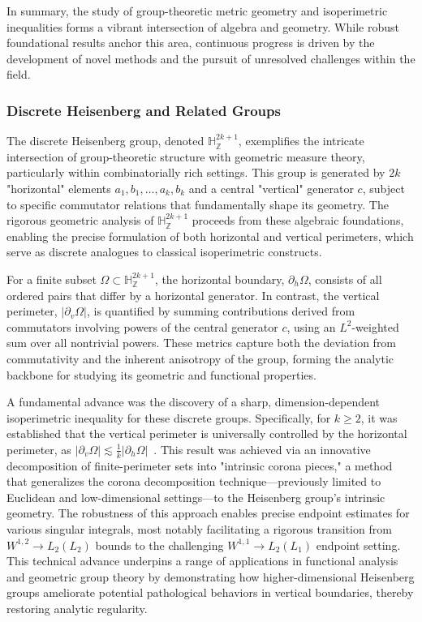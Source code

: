 \documentclass[sigconf]{acmart}
\begin{document}
In summary, the study of group-theoretic metric geometry and isoperimetric inequalities forms a vibrant intersection of algebra and geometry. While robust foundational results anchor this area, continuous progress is driven by the development of novel methods and the pursuit of unresolved challenges within the field.

\subsubsection{Discrete Heisenberg and Related Groups}

The discrete Heisenberg group, denoted $\mathbb{H}_{\mathbb{Z}}^{2k+1}$, exemplifies the intricate intersection of group-theoretic structure with geometric measure theory, particularly within combinatorially rich settings. This group is generated by $2k$ "horizontal" elements $a_1, b_1, \ldots, a_k, b_k$ and a central "vertical" generator $c$, subject to specific commutator relations that fundamentally shape its geometry. The rigorous geometric analysis of $\mathbb{H}_{\mathbb{Z}}^{2k+1}$ proceeds from these algebraic foundations, enabling the precise formulation of both horizontal and vertical perimeters, which serve as discrete analogues to classical isoperimetric constructs.

For a finite subset $\Omega \subset \mathbb{H}_{\mathbb{Z}}^{2k+1}$, the horizontal boundary, $\partial_{h}\Omega$, consists of all ordered pairs that differ by a horizontal generator. In contrast, the vertical perimeter, $|\partial_{v} \Omega|$, is quantified by summing contributions derived from commutators involving powers of the central generator $c$, using an $L^2$-weighted sum over all nontrivial powers. These metrics capture both the deviation from commutativity and the inherent anisotropy of the group, forming the analytic backbone for studying its geometric and functional properties.

A fundamental advance was the discovery of a sharp, dimension-dependent isoperimetric inequality for these discrete groups. Specifically, for $k \geq 2$, it was established that the vertical perimeter is universally controlled by the horizontal perimeter, as $|\partial_{v}\Omega| \lesssim \frac{1}{k} |\partial_{h}\Omega|$~\cite{ref108}. This result was achieved via an innovative decomposition of finite-perimeter sets into "intrinsic corona pieces," a method that generalizes the corona decomposition technique—previously limited to Euclidean and low-dimensional settings—to the Heisenberg group's intrinsic geometry. The robustness of this approach enables precise endpoint estimates for various singular integrals, most notably facilitating a rigorous transition from $W^{1,2} \to L_2(L_2)$ bounds to the challenging $W^{1,1} \to L_2(L_1)$ endpoint setting. This technical advance underpins a range of applications in functional analysis and geometric group theory by demonstrating how higher-dimensional Heisenberg groups ameliorate potential pathological behaviors in vertical boundaries, thereby restoring analytic regularity.
\end{document}
